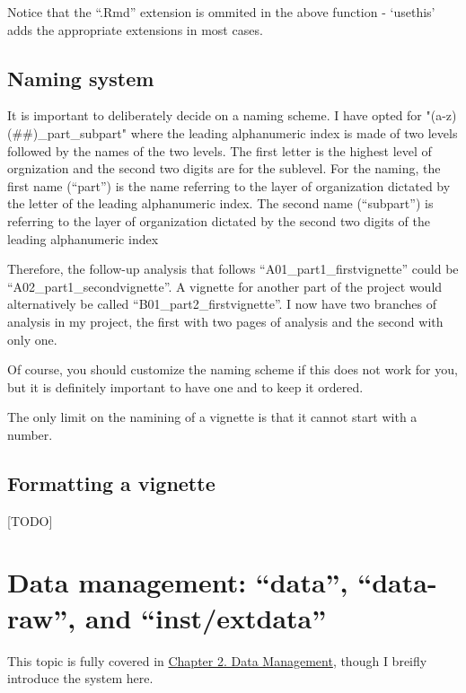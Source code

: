\documentclass[]{book}
\begin{document}
Notice that the ``.Rmd'' extension is ommited in the above function - `usethis' adds the appropriate extensions in most cases.

\hypertarget{naming-system}{%
\subsection{Naming system}\label{naming-system}}

It is important to deliberately decide on a naming scheme. I have opted for "(a-z)(\#\#)\_part\_subpart" where the leading alphanumeric index is made of two levels followed by the names of the two levels. The first letter is the highest level of orgnization and the second two digits are for the sublevel. For the naming, the first name (``part'') is the name referring to the layer of organization dictated by the letter of the leading alphanumeric index. The second name (``subpart'') is referring to the layer of organization dictated by the second two digits of the leading alphanumeric index

Therefore, the follow-up analysis that follows ``A01\_part1\_firstvignette'' could be ``A02\_part1\_secondvignette''. A vignette for another part of the project would alternatively be called ``B01\_part2\_firstvignette''. I now have two branches of analysis in my project, the first with two pages of analysis and the second with only one.

Of course, you should customize the naming scheme if this does not work for you, but it is definitely important to have one and to keep it ordered.

The only limit on the namining of a vignette is that it cannot start with a number.

\hypertarget{formatting-a-vignette}{%
\subsection{Formatting a vignette}\label{formatting-a-vignette}}

{[}TODO{]}

\hypertarget{data-management-data-data-raw-and-instextdata}{%
\section{Data management: ``data'', ``data-raw'', and ``inst/extdata''}\label{data-management-data-data-raw-and-instextdata}}

This topic is fully covered in \protect\hyperlink{data-management}{Chapter 2. Data Management}, though I breifly introduce the system here.
\end{document}
